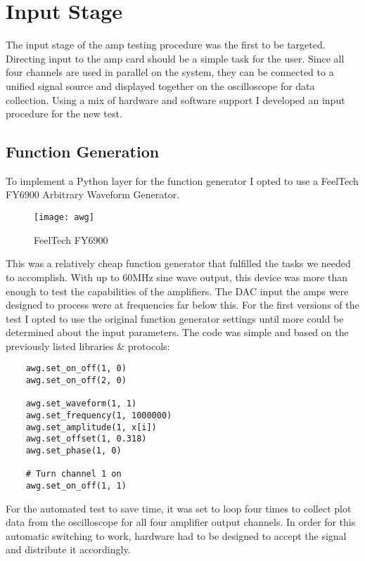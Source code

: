 \section{Input Stage}
The input stage of the amp testing procedure was the first to be targeted. Directing input to the amp card should be a simple task for the user. Since all four channels are used in parallel on the system, they can be connected to a unified signal source and displayed together on the oscilloscope for data collection. Using a mix of hardware and software support I developed an input procedure for the new test.
\subsection{Function Generation}
To implement a Python layer for the function generator I opted to use a FeelTech FY6900 Arbitrary Waveform Generator.
\begin{figure}[!htb]
	\centering
	\texttt{[image: awg]}
	\caption{FeelTech FY6900}
\end{figure}
This was a relatively cheap function generator that fulfilled the tasks we needed to accomplish. With up to 60MHz sine wave output, this device was more than enough to test the capabilities of the amplifiers. The DAC input the amps were designed to process were at frequencies far below this. For the first versions of the test I opted to use the original function generator settings until more could be determined about the input parameters. The code was simple and based on the previously listed libraries \& protocols:
\begin{lstlisting}
	awg.set_on_off(1, 0)
	awg.set_on_off(2, 0)

	awg.set_waveform(1, 1)
	awg.set_frequency(1, 1000000)
	awg.set_amplitude(1, x[i])
	awg.set_offset(1, 0.318)
	awg.set_phase(1, 0)

	# Turn channel 1 on
	awg.set_on_off(1, 1)
\end{lstlisting}
For the automated test to save time, it was set to loop four times to collect plot data from the oscilloscope for all four amplifier output channels. In order for this automatic switching to work, hardware had to be designed to accept the signal and distribute it accordingly.
